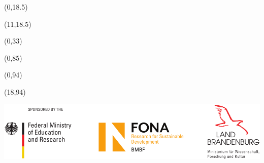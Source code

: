 \documentclass[20pt]{beamer}
\begin{document}
    \begin{frame}

        \begin{textblock}{10.5}(0,18.5)
            
        \end{textblock}

        \begin{textblock}{19}(11,18.5)
            
        \end{textblock}

        \begin{textblock}{30}(0,33)
            
        \end{textblock}

        \begin{textblock}{30}(0,85)
            
        \end{textblock}

        \begin{textblock}{17}(0,94)
            \begin{WhiteBox}
                \vspace{-1cm}
                \begin{block}{}
                    
                    
                \end{block}
            \end{WhiteBox}
        \end{textblock}

        \begin{textblock}{12}(18,94)
            \begin{WhiteBox}
                \vspace{-1cm}
                \begin{block}{}
                    \includegraphics[width=\textwidth]{img/Sponsor_logos}
                \end{block}
            \end{WhiteBox}
        \end{textblock}
    \end{frame}
\end{document}
